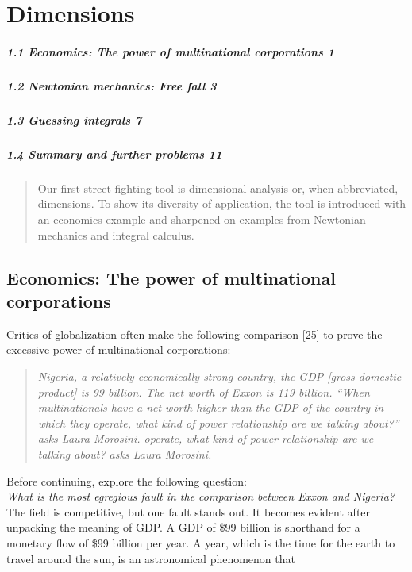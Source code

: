 \documentclass[12pt]{article}
\begin{document}
 


\section{{\bf Dimensions}}

\begin{quote}
\end{quote}

\subparagraph{1.1 Economics: The power of multinational corporations 1}
\subparagraph{1.2 Newtonian mechanics: Free fall 3}
\subparagraph{1.3 Guessing integrals 7}
\subparagraph{1.4 Summary and further problems 11}

\begin{quote}

Our first street-fighting tool is dimensional analysis or, when abbreviated,
dimensions. To show its diversity of application, the tool is introduced
with an economics example and sharpened on examples from Newtonian
mechanics and integral calculus.
\end{quote}
\begin{center}
\subsection{Economics: The power of multinational corporations}
\end{center}
Critics of globalization often make the following comparison [25] to prove
the excessive power of multinational corporations:

\begin{quote}
\textit{Nigeria, a relatively economically strong country, the GDP [gross domestic
product] is 99 billion. The net worth of Exxon is 119 billion. “When multinationals
have a net worth higher than the GDP of the country in which they
operate, what kind of power relationship are we talking about?” asks Laura
Morosini.
operate, what kind of power relationship are we talking about?  asks Laura
Morosini.}
\end{quote} 
Before continuing, explore the following question:\\
 {\it What is the most egregious fault in the comparison between Exxon and Nigeria?} \\
The field is competitive, but one fault stands out. It becomes evident after
unpacking the meaning of GDP. A GDP of \$99 billion is shorthand for
a monetary flow of \$99 billion per year. A year, which is the time for
the earth to travel around the sun, is an astronomical phenomenon that
\newpage
\pagestyle{fancy} 
\fancyhf{}
\end{document}
